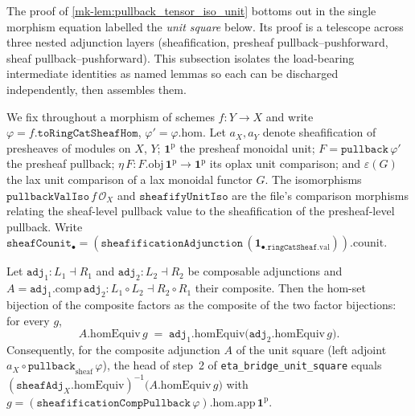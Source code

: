 The proof of \ref{mk-lem:pullback_tensor_iso_unit} bottoms out in the single morphism equation
labelled the \emph{unit square} below. Its proof is a telescope across three nested adjunction
layers (sheafification, presheaf pullback--pushforward, sheaf pullback--pushforward). This
subsection isolates the load-bearing intermediate identities as named lemmas so each can be
discharged independently, then assembles them.

We fix throughout a morphism of schemes \(f : Y \to X\) and write
\(\varphi = f.\mathtt{toRingCatSheafHom}\), \(\varphi' = \varphi.\mathrm{hom}\). Let \(a_X, a_Y\)
denote sheafification of presheaves of modules on \(X\), \(Y\); \(\mathbf{1}^{\mathrm{p}}\) the
presheaf monoidal unit; \(F = \mathtt{pullback}\,\varphi'\) the presheaf pullback;
\(\eta\,F : F.\mathrm{obj}\,\mathbf{1}^{\mathrm{p}} \to \mathbf{1}^{\mathrm{p}}\) its oplax unit
comparison; and \(\varepsilon(G)\) the lax unit comparison of a lax monoidal functor \(G\). The
isomorphisms \(\mathtt{pullbackValIso}\,f\,\mathcal{O}_X\) and \(\mathtt{sheafifyUnitIso}\) are
the file's comparison morphisms relating the sheaf-level pullback value to the sheafification of
the presheaf-level pullback. Write
\(\mathtt{sheafCounit}_\bullet = (\mathtt{sheafificationAdjunction}\,(\mathbf{1}_{\bullet.\mathtt{ringCatSheaf}.\mathrm{val}})).\mathrm{counit}\).

\begin{lemma}\label{mk-lem:comp_homequiv_factor_sheafify_pullback}
  \leanok

  Let \(\mathtt{adj}_1 : L_1 \dashv R_1\) and \(\mathtt{adj}_2 : L_2 \dashv R_2\) be composable
  adjunctions and \(A = \mathtt{adj}_1.\mathrm{comp}\,\mathtt{adj}_2 : L_1 \circ L_2 \dashv
  R_2 \circ R_1\) their composite. Then the hom-set bijection of the composite factors as the
  composite of the two factor bijections: for every \(g\),
  \[
    A.\mathrm{homEquiv}\,g
      \;=\;
    \mathtt{adj}_1.\mathrm{homEquiv}\bigl(\mathtt{adj}_2.\mathrm{homEquiv}\,g\bigr).
  \]
  Consequently, for the composite adjunction \(A\) of the unit square (left adjoint
  \(a_X \circ \mathtt{pullback}_{\mathrm{sheaf}}\,\varphi\)), the head of step~2 of
  \texttt{eta\_bridge\_unit\_square} equals
  \((\mathtt{sheafAdj}_X.\mathrm{homEquiv})^{-1}\bigl(A.\mathrm{homEquiv}\,g\bigr)\) with
  \(g = (\mathtt{sheafificationCompPullback}\,\varphi).\mathrm{hom}.\mathrm{app}\,\mathbf{1}^{\mathrm{p}}\).
\end{lemma}

